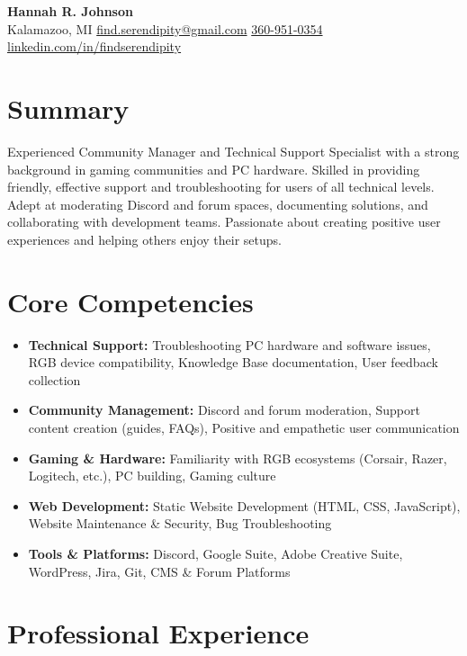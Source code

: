 \documentclass[a4paper,12pt]{article} %
\begin{document}
\begin{center}
    {\LARGE \textbf{Hannah R. Johnson}} \\
    \vspace{1mm}
    Kalamazoo, MI \textbar{} \href{mailto:find.serendipity@gmail.com}{find.serendipity@gmail.com} \textbar{} \href{tel:360-951-0354}{360-951-0354} \textbar{} \href{https://www.linkedin.com/in/findserendipity/}{linkedin.com/in/findserendipity}
\end{center}

\section{Summary}
Experienced Community Manager and Technical Support Specialist with a strong background in gaming communities and PC hardware. Skilled in providing friendly, effective support and troubleshooting for users of all technical levels. Adept at moderating Discord and forum spaces, documenting solutions, and collaborating with development teams. Passionate about creating positive user experiences and helping others enjoy their setups.

\section{Core Competencies}
\begin{itemize}
    \item \textbf{Technical Support:} Troubleshooting PC hardware and software issues, RGB device compatibility, Knowledge Base documentation, User feedback collection
    \item \textbf{Community Management:} Discord and forum moderation, Support content creation (guides, FAQs), Positive and empathetic user communication
    \item \textbf{Gaming \& Hardware:} Familiarity with RGB ecosystems (Corsair, Razer, Logitech, etc.), PC building, Gaming culture
    \item \textbf{Web Development:} Static Website Development (HTML, CSS, JavaScript), Website Maintenance \& Security, Bug Troubleshooting
    \item \textbf{Tools \& Platforms:} Discord, Google Suite, Adobe Creative Suite, WordPress, Jira, Git, CMS \& Forum Platforms
\end{itemize}

\section{Professional Experience}
\end{document}
